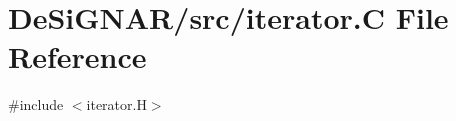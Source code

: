\hypertarget{iterator_8_c}{}\section{De\+Si\+G\+N\+A\+R/src/iterator.C File Reference}
\label{iterator_8_c}
{\ttfamily \#include $<$iterator.\+H$>$}\newline
